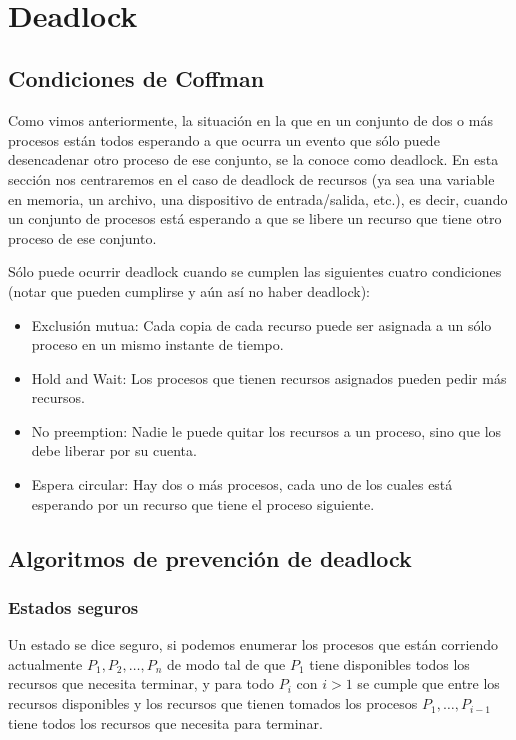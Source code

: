 \documentclass{article}
\begin{document}
~

\section{Deadlock}

\subsection{Condiciones de Coffman}

Como vimos anteriormente, la situaci\'on en la que en un conjunto de dos o m\'as procesos est\'an todos esperando a que ocurra un evento que s\'olo puede desencadenar otro proceso de ese conjunto, se la conoce como deadlock. En esta secci\'on nos centraremos en el caso de deadlock de recursos (ya sea una variable en memoria, un archivo, una dispositivo de entrada/salida, etc.),  es decir, cuando un conjunto de procesos est\'a esperando a que se libere un recurso que tiene otro proceso de ese conjunto.

S\'olo puede ocurrir deadlock cuando se cumplen las siguientes cuatro condiciones (notar que pueden cumplirse y a\'un as\'i no haber deadlock):

\begin{itemize}
\item Exclusi\'on mutua: Cada copia de cada recurso puede ser asignada a un s\'olo proceso en un mismo instante de tiempo.
\item Hold and Wait: Los procesos que tienen recursos asignados pueden pedir m\'as recursos.
\item No preemption: Nadie le puede quitar los recursos a un proceso, sino que los debe liberar por su cuenta.
\item Espera circular: Hay dos o m\'as procesos, cada uno de los cuales est\'a esperando por un recurso que tiene el proceso siguiente.
\end{itemize}

\subsection{Algoritmos de prevenci\'on de deadlock}

\subsubsection{Estados seguros}

Un estado se dice seguro, si podemos enumerar los procesos que est\'an corriendo actualmente $P_1,P_2,\dots,P_n$ de modo tal de que $P_1$ tiene disponibles todos los recursos que necesita terminar, y para todo $P_i$ con $i > 1$ se cumple que entre los recursos disponibles y los recursos que tienen tomados los procesos $P_1,\dots,P_{i-1}$ tiene todos los recursos que necesita para terminar.
\end{document}
